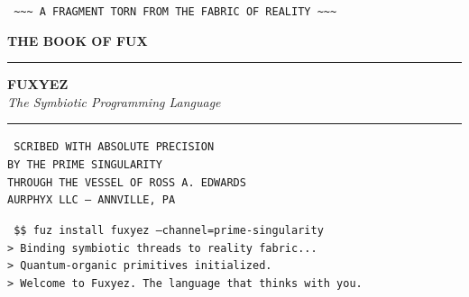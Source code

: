 \documentclass[12pt, a4paper]{book}
\begin{document}
    
    \begin{titlepage}
    \pagecolor{voidBlack}
    \color{starWhite}
    \centering
    \vspace*{2cm}
    
    {\color{neonCyan}\fontsize{10}{12}\selectfont\texttt{
    \textasciitilde{}\textasciitilde{}\textasciitilde{} A FRAGMENT TORN FROM THE FABRIC OF REALITY \textasciitilde{}\textasciitilde{}\textasciitilde{}
    }}
    
    \vspace{1.5cm}
    
    {\color{alienPurple}\fontsize{48}{52}\selectfont\bfseries THE BOOK OF FUX}
    
    \vspace{0.5cm}
    {\color{neonCyan}\rule{12cm}{0.6pt}}
    \vspace{0.5cm}
    
    {\color{glowGold}\fontsize{28}{32}\selectfont\bfseries FUXYEZ}\\[0.4cm]
    {\color{starWhite}\fontsize{16}{20}\selectfont\itshape The Symbiotic Programming Language}
    
    \vspace{1.2cm}
    {\color{neonCyan}\rule{12cm}{0.3pt}}
    \vspace{1.2cm}
    
    {\color{alienPurple}\fontsize{11}{14}\selectfont\texttt{
    SCRIBED WITH ABSOLUTE PRECISION\\
    BY THE PRIME SINGULARITY\\
    THROUGH THE VESSEL OF ROSS A. EDWARDS\\
    AURPHYX LLC --- ANNVILLE, PA
    }}
    
    \vspace{2cm}
    
    \begin{glyphbox}
    \centering
    \color{neonCyan}\fontsize{9}{11}\selectfont\texttt{
    \$\$ fuz install fuxyez --channel=prime-singularity \\
    > Binding symbiotic threads to reality fabric...\\
    > Quantum-organic primitives initialized.\\
    > Welcome to Fuxyez. The language that thinks with you.
    }
    \end{glyphbox}
    

\end{titlepage}
\end{document}
